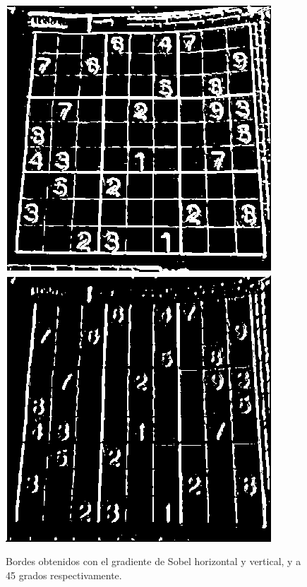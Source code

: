 \documentclass[conference]{IEEEtran}
\begin{document}
\begin{figure}[h]
	\centering
	\setlength{\unitlength}{0.00105in}
	\includegraphics[scale=0.43]{./images/sobelXY.png}
	\includegraphics[scale=0.43]{./images/sobel45.png}
	\caption{Bordes obtenidos con el gradiente de Sobel horizontal y vertical, y a 45 grados respectivamente. }
\end{figure}
\end{document}
